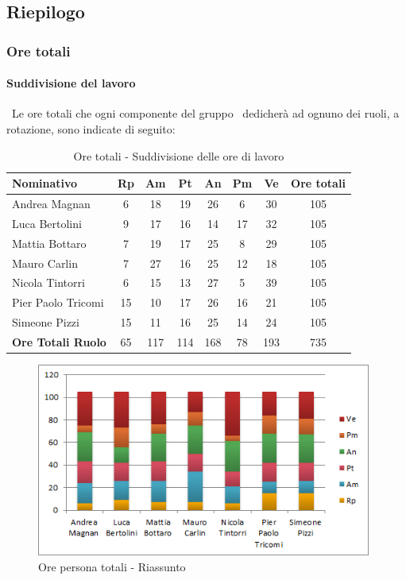 \documentclass[../PianoDiProgetto.tex]{subfiles}
\begin{document}
\vspace{35mm}	
	
	\subsection{Riepilogo}
			\subsubsection{Ore totali}
				\paragraph{Suddivisione del lavoro}\
					Le ore totali che ogni componente del gruppo \GRUPPO\ dedicherà ad ognuno dei ruoli, a rotazione, sono indicate di seguito:
	
	\begin{table}[H]
		\begin{tabularx}{\textwidth}{l  * {6}{c}  c}
			\toprule
			\textbf{Nominativo} & \textbf{Rp} & \textbf{Am} & \textbf{Pt} 
						& \textbf{An} & \textbf{Pm} & \textbf{Ve} & \textbf{Ore totali} \\
			\midrule
			Andrea Magnan  & 6  & 18 & 19 & 26 & 6  & 30 & 105 \\
			Luca Bertolini  & 9 & 17 & 16 & 14 & 17 & 32 & 105 \\
			Mattia Bottaro  & 7  & 19 & 17 & 25 & 8  & 29 & 105 \\
			Mauro Carlin  & 7 & 27 & 16 & 25 & 12 & 18 & 105 \\
			Nicola Tintorri  & 6 & 15 & 13 & 27 & 5 & 39 & 105 \\
			Pier Paolo Tricomi  & 15 & 10 & 17 & 26 & 16 & 21 & 105 \\
			Simeone Pizzi & 15 & 11 & 16 & 25 & 14 & 24 & 105 \\
			\midrule
			\textbf{Ore Totali Ruolo} & 65    & 117   & 114   & 168   & 78   & 193   & 735 \\
			\bottomrule
		\end{tabularx}
		\caption{Ore totali - Suddivisione delle ore di lavoro}
	\end{table}
	

\vfill
		
	\begin{figure}[H]
		\centering
		\includegraphics[width=11cm, trim=1cm 0cm 1cm 0cm]{grafici/TOT-persona}
			\caption{Ore persona totali - Riassunto}
	\end{figure}
	
\end{document}
